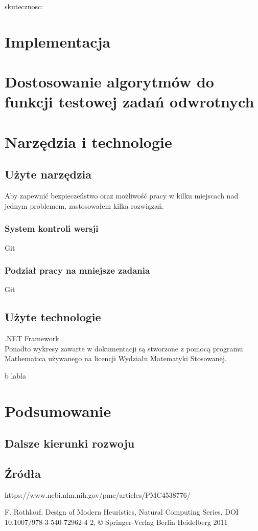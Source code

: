 \documentclass[twoside]{projektInzynierskiMS1}
\newcommand{\si}{ś}
\begin{document}
skutecznosc:\\

\section{Implementacja}
\section{Dostosowanie algorytmów do funkcji testowej zadań odwrotnych}
\section{Narzędzia i technologie}
	\subsection{Użyte narzędzia}
	Aby zapewnić bezpieczeństwo oraz możliwo\si ć pracy w kilku miejscach nad jednym problemem, zastosowałem kilka rozwiązań.
	\subsubsection{System kontroli wersji}
	Git
	\subsubsection{Podział pracy na mniejsze zadania}
	Git
	\subsection{Użyte technologie}
	.NET Framework \\
Ponadto wykresy zawarte w dokumentacji są stworzone z pomocą programu Mathematica używanego na licencji Wydziału Matematyki Stosowanej.

b labla
\section{Podsumowanie}
	\subsection{Dalsze kierunki rozwoju}
	\subsection{Źródła}
https://www.ncbi.nlm.nih.gov/pmc/articles/PMC4538776/

F. Rothlauf, Design of Modern Heuristics, Natural Computing Series,
DOI 10.1007/978-3-540-72962-4 2, © Springer-Verlag Berlin Heidelberg 2011
\end{document}
